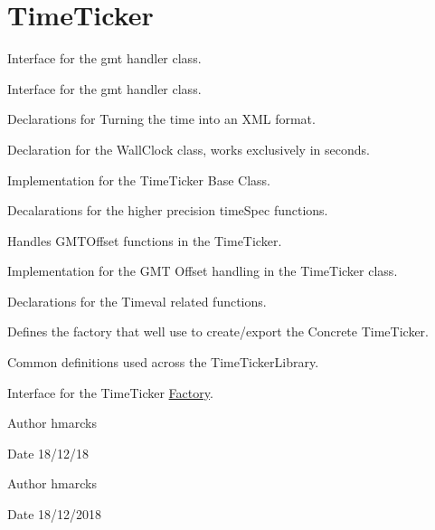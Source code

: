 \hypertarget{group__TimeTicker}{}\section{Time\+Ticker}
\label{group__TimeTicker}


Interface for the gmt handler class.  


Interface for the gmt handler class. 

Declarations for Turning the time into an X\+ML format.

Declaration for the Wall\+Clock class, works exclusively in seconds.

Implementation for the Time\+Ticker Base Class.

Decalarations for the higher precision time\+Spec functions.

Handles G\+M\+T\+Offset functions in the Time\+Ticker.

Implementation for the G\+MT Offset handling in the Time\+Ticker class.

Declarations for the Timeval related functions.

Defines the factory that we\textquotesingle{}ll use to create/export the Concrete Time\+Ticker.

Common definitions used across the Time\+Ticker\+Library.

Interface for the Time\+Ticker \mbox{\hyperlink{classFactory}{Factory}}.

\begin{DoxyAuthor}{Author}
hmarcks
\end{DoxyAuthor}
\begin{DoxyDate}{Date}
18/12/18
\end{DoxyDate}
\begin{DoxyAuthor}{Author}
hmarcks
\end{DoxyAuthor}
\begin{DoxyDate}{Date}
18/12/2018 
\end{DoxyDate}
